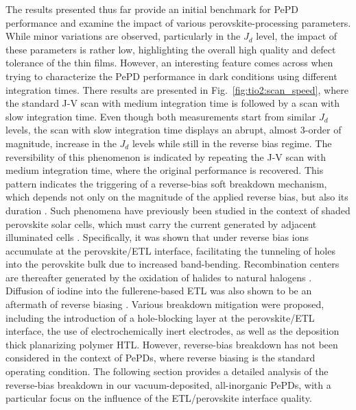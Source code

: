 The results presented thus far provide an initial benchmark for PePD performance and examine the impact of various perovskite-processing parameters. While minor variations are observed, particularly in the $J_d$ level, the impact of these parameters is rather low, highlighting the overall high quality and defect tolerance of the  thin films. However, an interesting feature comes across when trying to characterize the PePD performance in dark conditions using different integration times. There results are presented in Fig.~\ref{fig:tio2:scan_speed}, where the standard J-V scan with medium integration time is followed by a scan with slow integration time. Even though both measurements start from similar $J_d$ levels, the scan with slow integration time displays an abrupt, almost 3-order of magnitude, increase in the $J_d$ levels while still in the reverse bias regime. The reversibility of this phenomenon is indicated by repeating the J-V scan with medium integration time, where the original performance is recovered. This pattern indicates the triggering of a reverse-bias soft breakdown mechanism, which depends not only on the magnitude of the applied reverse bias, but also its duration \cite{Bertoluzzi2021IncorporatingBias}. Such phenomena have previously been studied in the context of shaded perovskite solar cells, which must carry the current generated by adjacent illuminated cells \cite{Jiang2024ImprovedElectrodes, Ren2024MobileCells, Li2024BarrierBias,Gould2021In-OperandoBias,Razera2020InstabilityBias,Bertoluzzi2021IncorporatingBias,Wang2023PerovskiteDegradation,Bowring2018ReverseCells, Ni2021EvolutionIllumination}. Specifically, it was shown that under reverse bias ions accumulate at the perovskite/ETL interface, facilitating the tunneling of holes into the perovskite bulk due to increased band-bending. Recombination centers are thereafter generated by the oxidation of halides to natural halogens \cite{Bertoluzzi2021IncorporatingBias}. Diffusion of iodine into the fullerene-based ETL was also shown to be an aftermath of reverse biasing \cite{Razera2020InstabilityBias}. Various breakdown mitigation were proposed, including the introduction of a hole-blocking layer at the perovskite/ETL interface, the use of electrochemically inert electrodes, as well as the deposition thick planarizing polymer HTL. However, reverse-bias breakdown has not been considered in the context of PePDs, where reverse biasing is the standard operating condition. The following section provides a detailed analysis of the reverse-bias breakdown in our vacuum-deposited, all-inorganic PePDs, with a particular focus on the influence of the ETL/perovskite interface quality.


